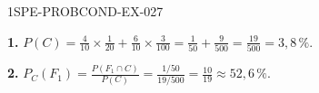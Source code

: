 \begin{corrige}{1SPE-PROBCOND-EX-027}

\textbf{1.} $P(C) = \frac{4}{10}\times\frac{1}{20} + \frac{6}{10}\times\frac{3}{100} = \frac{1}{50}+\frac{9}{500} = \frac{19}{500} = 3{,}8\,\%$.

\textbf{2.} $P_C(F_1) = \frac{P(F_1 \cap C)}{P(C)} = \frac{1/50}{19/500} = \frac{10}{19} \approx 52{,}6\,\%$.

\end{corrige}
